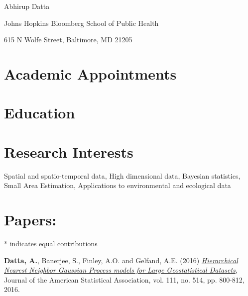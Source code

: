 \documentclass[11pt,a4paper,sans]{moderncv} %
\title{}
\begin{document}
{\huge Abhirup Datta \hfill \large {} 

{Johns Hopkins Bloomberg School of Public Health \hfill \large {}}

{615 N Wolfe Street, Baltimore, MD 21205} \hfill {\large \textcolor{blue}{}}

\hrulefill

\section{Academic Appointments}

\section{Education}

\vskip 2mm 

\vskip 2mm 

\section{Research Interests}
Spatial and spatio-temporal data, High dimensional data, Bayesian statistics, Small Area Estimation, Applications to environmental and ecological data

\section{Papers: }

* indicates equal contributions

\vskip 4mm \textbf {Datta, A.}, Banerjee, S., Finley, A.O. and Gelfand, A.E. (2016) \href{http://www.tandfonline.com/doi/abs/10.1080/01621459.2015.1044091}{\em Hierarchical Nearest Neighbor Gaussian Process models for Large Geostatistical Datasets}, Journal of the American Statistical Association, vol. 111, no. 514, pp. 800-812, 2016.

}
\end{document}
